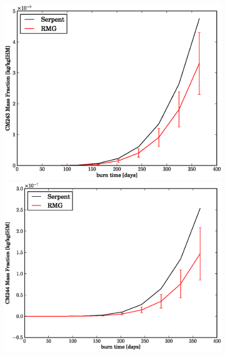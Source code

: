 \begin{figure}[htbp]
\begin{center}
\includegraphics[scale=0.3]{multigroup_method/figs/benchmark/CM243_Mass_Fraction_.eps}
\includegraphics[scale=0.3]{multigroup_method/figs/benchmark/CM244_Mass_Fraction_.eps}
\end{center}
\end{figure}
